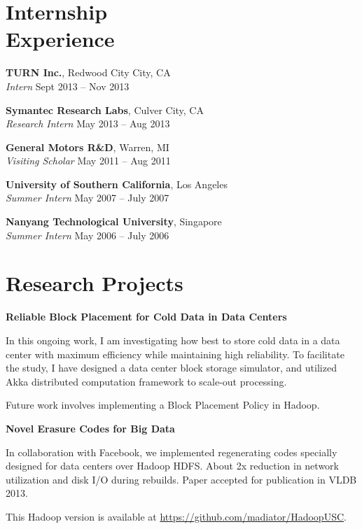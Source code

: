 \documentclass[margin,line]{resume}
\begin{document}
\begin{resume}
\section{\mysidestyle Internship\\Experience}

	\textbf{TURN Inc.}, Redwood City City, CA\\
    \textsl{Intern} \hfill Sept 2013 -- Nov 2013
    
    \textbf{Symantec Research Labs}, Culver City, CA\\
    \textsl{Research Intern} \hfill May 2013 -- Aug 2013
	
    \textbf{General Motors R\&D}, Warren, MI\\
    \textsl{Visiting Scholar} \hfill May 2011 -- Aug 2011

    \textbf{University of Southern California}, Los Angeles\\%
    \textsl{Summer Intern} \hfill May 2007 -- July 2007

    \textbf{Nanyang Technological University}, Singapore \\%
    \textsl{Summer Intern} \hfill May 2006 -- July 2006

\section{\mysidestyle Research Projects}
  \textbf{Reliable Block Placement for Cold Data in Data Centers} 
  \begin{list2}
  \item In this ongoing work, I am investigating how best to store cold data in a data center with maximum efficiency while maintaining high reliability. To facilitate the study, I have designed a data center block storage simulator, and utilized Akka distributed computation framework to scale-out processing.
\newpage
  \item Future work involves implementing a Block Placement Policy in Hadoop.
  \end{list2} 


	
	\textbf{Novel Erasure Codes for Big Data}
  \begin{list2}
   \item In collaboration with Facebook, we implemented regenerating codes specially designed for data centers over Hadoop HDFS. About 2x reduction in network utilization and disk I/O during rebuilds. Paper accepted for publication in VLDB 2013.
   \item This Hadoop version is available at \href{https://github.com/madiator/HadoopUSC}{https://github.com/madiator/HadoopUSC}. 
  \end{list2}
	

\end{resume}
\end{document}
